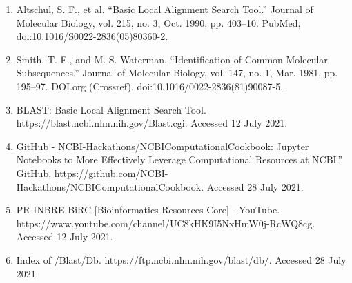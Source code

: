 \documentclass[12pt, a4paper]{report}
\begin{document}
\begin{enumerate}

    \item {\small Altschul, S. F., et al. “Basic Local Alignment Search Tool.” Journal of Molecular Biology, vol. 215, no. 3, Oct. 1990, pp. 403–10. PubMed, doi:10.1016/S0022-2836(05)80360-2.}
    
    \item {\small Smith, T. F., and M. S. Waterman. “Identification of Common Molecular Subsequences.” Journal of Molecular Biology, vol. 147, no. 1, Mar. 1981, pp. 195–97. DOI.org (Crossref), doi:10.1016/0022-2836(81)90087-5.}
    
    \item {\small BLAST: Basic Local Alignment Search Tool. https://blast.ncbi.nlm.nih.gov/Blast.cgi. Accessed 12 July 2021.}
    
    \item {\small GitHub - NCBI-Hackathons/NCBIComputationalCookbook: Jupyter Notebooks to More Effectively Leverage Computational Resources at NCBI.” GitHub, https://github.com/NCBI-Hackathons/NCBIComputationalCookbook. Accessed 28 July 2021.}
    
    \item {\small PR-INBRE BiRC [Bioinformatics Resources Core] - YouTube. \\ https://www.youtube.com/channel/UC8kHK9I5NxHmW0j-RcWQ8cg. Accessed 12 July 2021.}
    
    \item {\small Index of /Blast/Db. https://ftp.ncbi.nlm.nih.gov/blast/db/. Accessed 28 July 2021.}
\end{enumerate}
\end{document}
